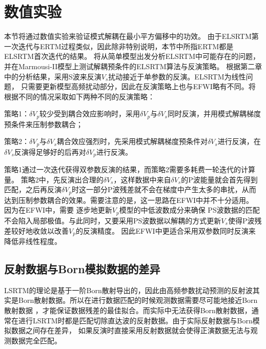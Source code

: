 \section{数值实验}
本节将通过数值实验来验证模式解耦在最小平方偏移中的功效。
由于ELSRTM第一次迭代与ERTM过程类似，因此除非特别说明，本节中所指ERTM都是ELSRTM首次迭代的结果。
将从简单模型出发分析ELSRTM中可能存在的问题，并在Marmousi-II模型上测试解耦预条件的ELSRTM算法与反演策略。
根据第二章中的分析结果，采用S波来反演$V_s$扰动接近于单参数的反演。ELSRTM为线性问题，
只需要更新模型高频扰动部分，因此在反演策略上也与EFWI略有不同。将根据不同的情况采取如下两种不同的反演策略：

策略1：$\delta V_p$较少受到耦合效应影响时，采用$\delta V_p$与$\delta
V_s$同时反演，并用模式解耦梯度预条件来压制参数耦合；

策略2：$\delta V_p$与$\delta V_s$耦合效应强烈时，先采用模式解耦梯度预条件对$\delta V_s$进行反演，在$\delta
V_s$反演得足够好的后再对$\delta V_p$进行反演。

策略1通过一次迭代获得双参数反演的结果，而策略2需要多耗费一轮迭代的计算量。
策略2中，先反演出合理的$\delta V_s$，这样数据中来自$\delta
V_s$的P波能量就会首先得到匹配，之后再反演$\delta
V_p$时这一部分P波残差就不会在梯度中产生太多的串扰，从而达到压制参数耦合的效果。需要注意的是，这一思路在EFWI中并不十分适用。
因为在EFWI中，需要
逐步地更新$V_p$模型的中低波数成分来确保
PS波数据的匹配不会陷入局部极值。与此同时，又要采用PS波数据以解耦的方式更新$V_s$使得P波残差较好地收敛以改善$V_p$的反演精度。
因此EFWI中更适合采用双参数同时反演来降低非线性程度。


\subsection{反射数据与Born模拟数据的差异}
LSRTM的理论是基于一阶Born散射导出的，因此由高频参数扰动预测的反射波其实是Born散射数据。所以在进行数据匹配的时候观测数据需要尽可能地接近Born散射数据
，才能保证数据残差的最佳拟合。而实际中无法获得Born散射数据，通常在进行LSRTM时都是匹配切除直达波的反射数据。由于实际反射数据与Born模拟数据之间存在差异，
如果反演时直接采用反射数据就会使得正演数据无法与观测数据完全匹配。

